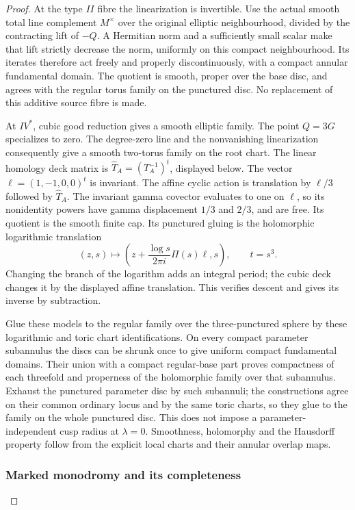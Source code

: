 \begin{proof}
At the type \(II\) fibre the linearization is invertible. Use the actual smooth total line complement \(M^\times\) over the original elliptic neighbourhood, divided by the contracting lift of \(-Q\). A Hermitian norm and a sufficiently small scalar make that lift strictly decrease the norm, uniformly on this compact neighbourhood. Its iterates therefore act freely and properly discontinuously, with a compact annular fundamental domain. The quotient is smooth, proper over the base disc, and agrees with the regular torus family on the punctured disc. No replacement of this additive source fibre is made.

At \(IV^*\), cubic good reduction gives a smooth elliptic family. The point \(Q=3G\) specializes to zero. The degree-zero line and the nonvanishing linearization consequently give a smooth two-torus family on the root chart. The linear homology deck matrix is \(\widehat T_A=(T_A^{-1})^t\), displayed below. The vector \(\ell=(1,-1,0,0)^t\) is invariant. The affine cyclic action is translation by \(\ell/3\) followed by \(\widehat T_A\). The invariant gamma covector evaluates to one on \(\ell\), so its nonidentity powers have gamma displacement \(1/3\) and \(2/3\), and are free. Its quotient is the smooth finite cap. Its punctured gluing is the holomorphic logarithmic translation \[
 (z,s)\longmapsto
 \left(z+\frac{\log s}{2\pi i}\Pi(s)\ell,s\right),
 \qquad t=s^3.
\] Changing the branch of the logarithm adds an integral period; the cubic deck changes it by the displayed affine translation. This verifies descent and gives its inverse by subtraction.

Glue these models to the regular family over the three-punctured sphere by these logarithmic and toric chart identifications. On every compact parameter subannulus the discs can be shrunk once to give uniform compact fundamental domains. Their union with a compact regular-base part proves compactness of each threefold and properness of the holomorphic family over that subannulus. Exhaust the punctured parameter disc by such subannuli; the constructions agree on their common ordinary locus and by the same toric charts, so they glue to the family on the whole punctured disc. This does not impose a parameter-independent cusp radius at \(\lambda=0\). Smoothness, holomorphy and the Hausdorff property follow from the explicit local charts and their annular overlap maps.

\subsubsection{Marked monodromy and its completeness}\label{marked-monodromy-and-its-completeness}


\end{proof}
